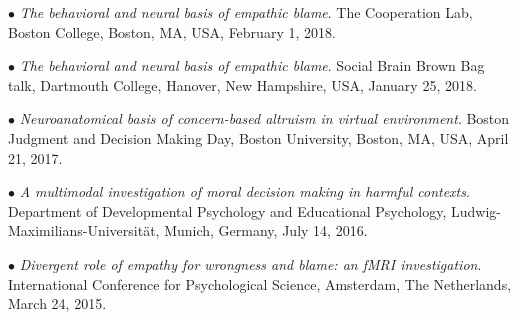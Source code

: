 \documentclass[10pt]{article}
\begin{document}
	$\bullet$ \textit{The behavioral and neural basis of empathic blame}. The Cooperation Lab, Boston College, Boston, MA, USA, \hspace*{0.1in}February 1, 2018.\\
	\miniskip	
	
	$\bullet$ \textit{The behavioral and neural basis of empathic blame}. Social Brain Brown Bag talk, Dartmouth College, \hspace*{0.1in}Hanover, New Hampshire, USA, January 25, 2018.\\
	\miniskip
	
	$\bullet$ \textit{Neuroanatomical basis of concern-based altruism in virtual environment}. Boston Judgment and Decision \hspace*{0.1in}Making Day, Boston University, Boston, MA, USA, April 21, 2017.\\
	\miniskip
	
%	

	$\bullet$ \textit{A multimodal investigation of moral decision making in harmful contexts}. Department of Developmental \hspace*{0.1in}Psychology and Educational Psychology, Ludwig-Maximilians-Universit{\"a}t, Munich, Germany, July 14, 2016.\\
	\miniskip
		
	$\bullet$ \textit{Divergent role of empathy for wrongness and blame: an fMRI investigation}. International Conference for \hspace*{0.1in}Psychological Science, Amsterdam, The Netherlands, March 24, 2015.\\
	\miniskip
	
%	
%	
%	
\end{document}
